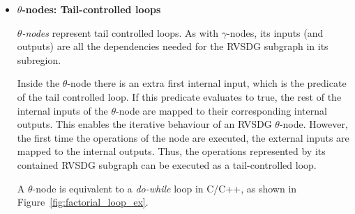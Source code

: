 \begin{itemize}
\item \textbf{$\theta$-nodes: Tail-controlled loops}

\textit{$\theta$-nodes} represent tail controlled loops. As with
$\gamma$-nodes, its inputs (and outputs) are all the dependencies needed for the
RVSDG subgraph in its subregion.

Inside the $\theta$-node there is an extra first internal input, which is the
predicate of the tail controlled loop. If this predicate evaluates to true, the
rest of the internal inputs of the $\theta$-node are mapped to their
corresponding internal outputs. This enables the iterative behaviour of an RVSDG
$\theta$-node. However, the first time the operations of the node are executed,
the external inputs are mapped to the internal outputs. Thus, the operations
represented by its contained RVSDG subgraph can be executed as a tail-controlled
loop.

A $\theta$-node is equivalent to a \textit{do-while} loop in C/C++, as shown in
Figure~\ref{fig:factorial_loop_ex}.


\end{itemize}
